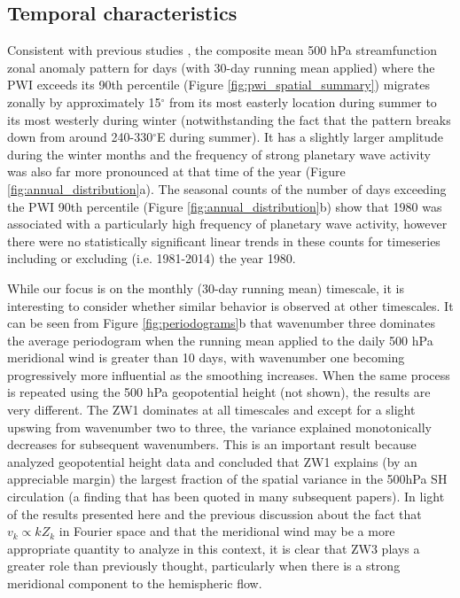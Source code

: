\subsection{Temporal characteristics}

Consistent with previous studies \citep[e.g.][]{vanLoon1984,Mo1985}, the composite mean 500 hPa streamfunction zonal anomaly pattern for days (with 30-day running mean applied) where the PWI exceeds its 90th percentile (Figure \ref{fig:pwi_spatial_summary}) migrates zonally by approximately 15$^{\circ}$ from its most easterly location during summer to its most westerly during winter (notwithstanding the fact that the pattern breaks down from around 240-330$^{\circ}$E during summer). It has a slightly larger amplitude during the winter months and the frequency of strong planetary wave activity was also far more pronounced at that time of the year (Figure \ref{fig:annual_distribution}a). The seasonal counts of the number of days exceeding the PWI 90th percentile (Figure \ref{fig:annual_distribution}b) show that 1980 was associated with a particularly high frequency of planetary wave activity, however there were no statistically significant linear trends in these counts for timeseries including or excluding (i.e. 1981-2014) the year 1980.  

While our focus is on the monthly (30-day running mean) timescale, it is interesting to consider whether similar behavior is observed at other timescales. It can be seen from Figure \ref{fig:periodograms}b that wavenumber three dominates the average periodogram when the running mean applied to the daily 500 hPa meridional wind is greater than 10 days, with wavenumber one becoming progressively more influential as the smoothing increases. When the same process is repeated using the 500 hPa geopotential height (not shown), the results are very different. The ZW1 dominates at all timescales and except for a slight upswing from wavenumber two to three, the variance explained monotonically decreases for subsequent wavenumbers. This is an important result because \citet{vanLoon1972} analyzed geopotential height data and concluded that ZW1 explains (by an appreciable margin) the largest fraction of the spatial variance in the 500hPa SH circulation (a finding that has been quoted in many subsequent papers). In light of the results presented here and the previous discussion about the fact that $v_k \propto k Z_k$ in Fourier space and that the meridional wind may be a more appropriate quantity to analyze in this context, it is clear that ZW3 plays a greater role than previously thought, particularly when there is a strong meridional component to the hemispheric flow. 

    